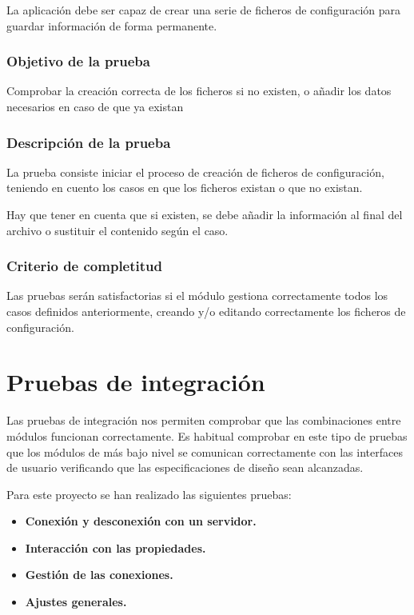 La aplicación debe ser capaz de crear una serie de ficheros de configuración para guardar información de forma permanente.

\subsubsection{Objetivo de la prueba}

Comprobar la creación correcta de los ficheros si no existen, o añadir los datos necesarios en caso de que ya existan

\subsubsection{Descripción de la prueba}

La prueba consiste iniciar el proceso de creación de ficheros de configuración, teniendo en cuento los casos en que los ficheros existan o que no existan.

Hay que tener en cuenta que si existen, se debe añadir la información al final del archivo o sustituir el contenido según el caso.


\subsubsection{Criterio de completitud}

Las pruebas serán satisfactorias si el módulo gestiona correctamente todos los casos definidos anteriormente, creando y/o editando correctamente los ficheros de configuración.

\newpage
\section{Pruebas de integración}

Las pruebas de integración nos permiten comprobar que las combinaciones entre módulos funcionan correctamente. Es habitual comprobar en este tipo de pruebas que los módulos de más bajo nivel se comunican correctamente con las interfaces de usuario verificando que las especificaciones de diseño sean alcanzadas.

Para este proyecto se han realizado las siguientes pruebas:

\begin{itemize}
  \item \textbf{Conexión y desconexión con un servidor.}
  \item \textbf{Interacción con las propiedades.}
  \item \textbf{Gestión de las conexiones.}
  \item \textbf{Ajustes generales.}
\end{itemize}



